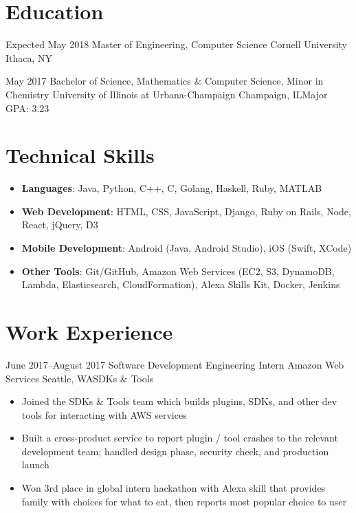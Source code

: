 \documentclass[10pt,a4paper,sans]{moderncv}        %
\begin{document}
\makecvtitle

\section{Education}

\vspace{2pt}
\cventry
{Expected May 2018}
{Master of Engineering, Computer Science}
{Cornell University}
{Ithaca, NY}{}{}

\cventry
{May 2017}
{Bachelor of Science, Mathematics \& Computer Science, Minor in Chemistry}
{University of Illinois at Urbana-Champaign}
{Champaign, IL}{}{Major GPA: 3.23}

\section{Technical Skills}
\vspace{2pt}
\begin{itemize}
  \vspace{3pt}
  \item
    \textbf{Languages}: Java, Python, C++, C, Golang, Haskell, Ruby, MATLAB
  \item
    \textbf{Web Development}: HTML, CSS, JavaScript, Django, Ruby on Rails, Node,
                              React, jQuery, D3
  \item
    \textbf{Mobile Development}: Android (Java, Android Studio), iOS (Swift, XCode)
  \item
    \textbf{Other Tools}: Git/GitHub, Amazon Web Services (EC2, S3, DynamoDB, Lambda, Elasticsearch, CloudFormation),
     Alexa Skills Kit, Docker, Jenkins
\end{itemize}

\section{Work Experience}
\vspace{2pt}

\cventry
{June 2017--August 2017}
{\vspace{3pt}Software Development Engineering Intern}
{Amazon Web Services}
{Seattle, WA}{SDKs \& Tools}
{
\begin{itemize}
  \item Joined the SDKs \& Tools team which builds plugins, SDKs, and other dev tools for interacting with AWS services
  \item Built a cross-product service to report plugin / tool crashes to the relevant development team; handled design phase, security check, and production launch
  \item Won 3rd place in global intern hackathon with Alexa skill that provides family with choices for what to eat, then reports most popular choice to user
\end{itemize}}
\end{document}

